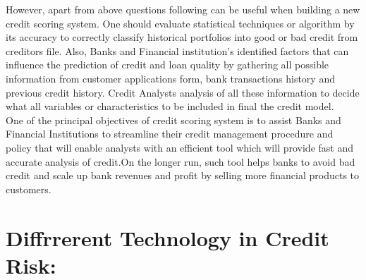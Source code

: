 {However, apart from above questions following can be useful when building a new credit scoring system. One should evaluate statistical techniques or algorithm by its accuracy to correctly classify historical portfolios into good or bad credit from creditors file. Also, Banks and Financial institution's identified factors that can influence the prediction of credit and loan quality by gathering all possible information from customer applications form, bank transactions history and previous credit history. Credit Analysts analysis of all these information to decide what all variables or characteristics to be included in final the credit model.\\


One of the principal objectives of credit scoring system is to assist Banks and Financial Institutions to streamline their credit management procedure and policy that will enable analysts with an efficient tool which will provide fast and accurate analysis of credit.On the longer run, such tool helps banks to avoid bad credit and scale up bank revenues and profit by selling more financial products to customers.\\


\section{Diffrrerent Technology in Credit Risk:}



}
